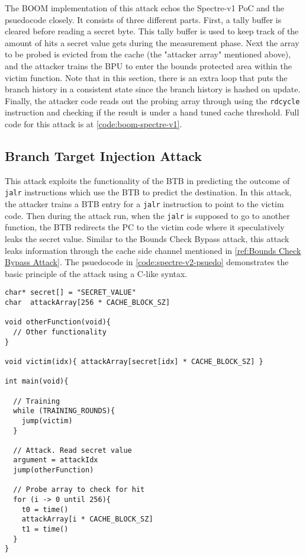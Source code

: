 
The BOOM implementation of this attack echos the Spectre-v1 PoC and the psuedocode closely.
It consists of three different parts. First, a tally buffer is cleared before reading a secret byte.
This tally buffer is used to keep track of the amount of hits a secret value gets during the measurement
phase. Next the array to be probed is evicted from the cache (the "attacker array" mentioned above), and
the attacker trains the BPU to enter the bounds protected area within the victim function. Note that in
this section, there is an extra loop that puts the branch history in a consistent state since the branch
history is hashed on update. Finally, the attacker code reads out the probing array through using the
{\tt rdcycle} instruction and checking if the result is under a hand tuned cache threshold. Full code for 
this attack is at \ref{code:boom-spectre-v1}.

\subsection{Branch Target Injection Attack}

This attack exploits the functionality of the BTB in predicting the outcome
of {\tt jalr} instructions which use the BTB to predict the destination. In this attack,
the attacker trains a BTB entry for a {\tt jalr} instruction to point to 
the victim code. Then during the attack run, when the {\tt jalr} is supposed to go to another function,
the BTB redirects the PC to the victim code where it speculatively leaks the secret value. Similar to the
Bounds Check Bypass attack, this attack leaks information through the
cache side channel mentioned in \ref{ref:Bounds Check Bypass Attack}. The psuedocode in 
\ref{code:spectre-v2-psuedo} demonstrates the basic principle of the attack using a C-like syntax.

\begin{lstlisting}[style=column-code, caption=Psuedocode of Bounds Check Bypass Attack]
char* secret[] = "SECRET_VALUE"
char  attackArray[256 * CACHE_BLOCK_SZ]

void otherFunction(void){
  // Other functionality    
}

void victim(idx){ attackArray[secret[idx] * CACHE_BLOCK_SZ] }

int main(void){
  
  // Training
  while (TRAINING_ROUNDS){
    jump(victim)
  }

  // Attack. Read secret value
  argument = attackIdx
  jump(otherFunction)

  // Probe array to check for hit
  for (i -> 0 until 256){
    t0 = time()
    attackArray[i * CACHE_BLOCK_SZ]
    t1 = time()
  }
}
\end{lstlisting}\label{code:spectre-v2-pseudo}

